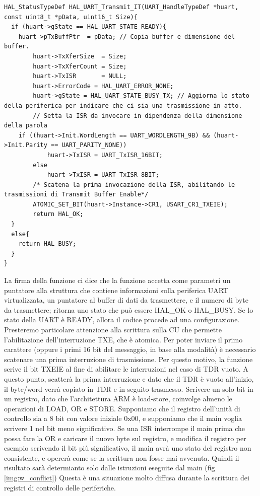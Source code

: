 \begin{lstlisting}
HAL_StatusTypeDef HAL_UART_Transmit_IT(UART_HandleTypeDef *huart, const uint8_t *pData, uint16_t Size){
  if (huart->gState == HAL_UART_STATE_READY){
   	huart->pTxBuffPtr  = pData; // Copia buffer e dimensione del buffer.
    	huart->TxXferSize  = Size;
    	huart->TxXferCount = Size;
    	huart->TxISR       = NULL;
    	huart->ErrorCode = HAL_UART_ERROR_NONE; 
    	huart->gState = HAL_UART_STATE_BUSY_TX; // Aggiorna lo stato della periferica per indicare che ci sia una trasmissione in atto.
    	// Setta la ISR da invocare in dipendenza della dimensione della parola
	if ((huart->Init.WordLength == UART_WORDLENGTH_9B) && (huart->Init.Parity == UART_PARITY_NONE))
      		huart->TxISR = UART_TxISR_16BIT;
    	else
      		huart->TxISR = UART_TxISR_8BIT;
    	/* Scatena la prima invocazione della ISR, abilitando le trasmissioni di Transmit Buffer Enable*/
    	ATOMIC_SET_BIT(huart->Instance->CR1, USART_CR1_TXEIE);
    	return HAL_OK;
  }
  else{
    return HAL_BUSY;
  }
}
\end{lstlisting}

La firma della funzione ci dice che la funzione accetta come parametri un puntatore alla struttura che contiene informazioni sulla periferica UART virtualizzata, un puntatore al buffer di dati da trasmettere, e il numero di byte da trasmettere; ritorna uno stato che può essere HAL\_OK o HAL\_BUSY. 
Se lo stato della UART è READY, allora il codice procede ad una configurazione. Presteremo particolare attenzione alla scrittura sulla CU che permette l'abilitazione dell'interruzione TXE, che è atomica.
Per poter inviare il primo carattere (oppure i primi 16 bit del messaggio, in base alla modalità) è necessario scatenare una prima interruzione di trasmissione. Per questo motivo, la funzione scrive il bit TXEIE al fine di abilitare le interruzioni nel caso di TDR vuoto. A questo punto, scatterà la prima interruzione e dato che il TDR è vuoto all'inizio, il byte/word verrà copiato in TDR e in seguito trasmesso.
Scrivere un solo bit in un registro, dato che l'architettura ARM è load-store, coinvolge almeno le operazioni di LOAD, OR e STORE. 
Supponiamo che il registro dell'unità di controllo sia a 8 bit con valore iniziale 0x00, e supponiamo che il main voglia scrivere 1 nel bit meno significativo. Se una ISR interrompe il main prima che possa fare la OR e caricare il nuovo byte sul registro, e modifica il registro per esempio scrivendo il bit più significativo, il main avrà uno stato del registro non consistente, e opererà come se la scrittura non fosse mai avvenuta. Quindi il risultato sarà determianto solo dalle istruzioni eseguite dal main (fig \ref{img:w_conflict}) 
Questa è una situazione molto diffusa durante la scrittura dei registri di controllo delle periferiche.

